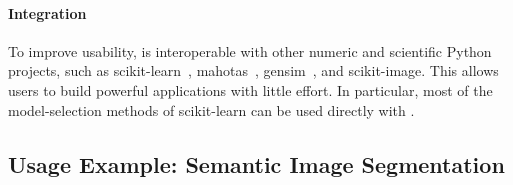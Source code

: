 \paragraph{Integration}
     To improve usability, \pystruct is interoperable with other numeric and scientific Python projects,
     such as {\sc scikit-learn}~\citep{pedregosa2011scikit},
     {\sc mahotas}~\citep{coelho:mahotas}, {\sc gensim}~\citep{rehurek_lrec}, and {\sc scikit-image}.
     This allows users to build powerful applications with little effort. In
     particular, most of the model-selection methods of {\sc scikit-learn} can be used
     directly with \pystruct.


\subsection{Usage Example: Semantic Image Segmentation}\label{sec:examples}

%

